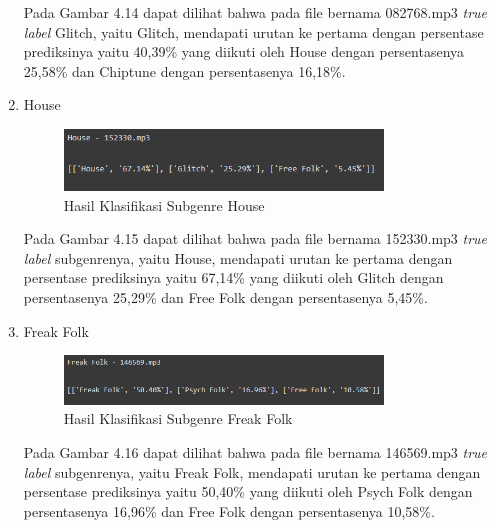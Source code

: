 \begin{enumerate}
	Pada Gambar 4.14 dapat dilihat bahwa pada file bernama 082768.mp3 \emph{true label} Glitch, yaitu Glitch, mendapati urutan ke pertama dengan persentase prediksinya yaitu 40,39\% yang diikuti oleh House dengan persentasenya 25,58\% dan Chiptune dengan persentasenya 16,18\%.
	
	\item House
	
	\begin{figure}[H]
		\centering
		
		\includegraphics[width=0.8\textwidth]{gambar/classification_house}
		
		\caption{Hasil Klasifikasi Subgenre House}
		\label{fig:klas_house}
	\end{figure}
	
	Pada Gambar 4.15 dapat dilihat bahwa pada file bernama 152330.mp3 \emph{true label} subgenrenya, yaitu House, mendapati urutan ke pertama dengan persentase prediksinya yaitu 67,14\% yang diikuti oleh Glitch dengan persentasenya 25,29\% dan Free Folk dengan persentasenya 5,45\%.
	
	\item Freak Folk
	
	\begin{figure}[H]
		\centering
		
		\includegraphics[width=0.8\textwidth]{gambar/classification_freak folk}
		
		\caption{Hasil Klasifikasi Subgenre Freak Folk}
		\label{fig:klas_freakfolk}
	\end{figure}
	
	Pada Gambar 4.16 dapat dilihat bahwa pada file bernama 146569.mp3 \emph{true label} subgenrenya, yaitu Freak Folk, mendapati urutan ke pertama dengan persentase prediksinya yaitu 50,40\% yang diikuti oleh Psych Folk dengan persentasenya 16,96\% dan Free Folk dengan persentasenya 10,58\%.
	

\end{enumerate}
